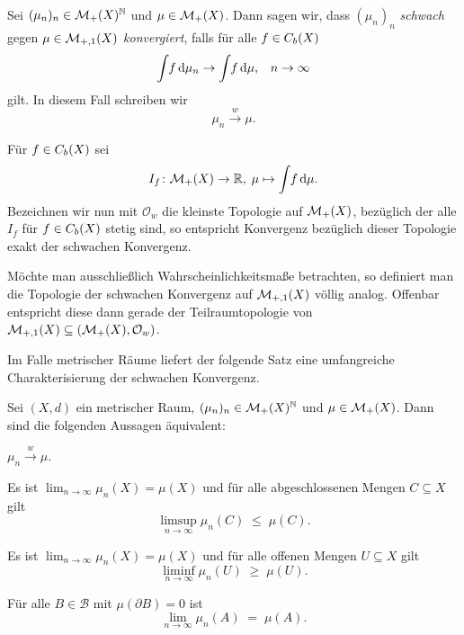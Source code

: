 \documentclass[../main/main.tex]{subfiles}
\begin{document}
	\begin{Definition}
		\label{def:weakconvergence}
		Sei $(\mu_n)_n \in \mathcal{M}_{+}(X)^{\mathbb{N}}$ und $\mu \in \mathcal{M}_{+}(X)$. 
		Dann sagen wir, dass $(\mu_n)_n$ 
		\emph{schwach} gegen $\mu \in \mathcal{M}_{+,1}(X)$ \emph{konvergiert}, 
		falls für alle $f \in C_b(X)$
		$$\int_{} \, f \, \mathrm{d}\mu_n \to \int_{} \, f \, \mathrm{d}\mu\text{,} 
		\quad n \to \infty $$
		gilt. In diesem Fall schreiben wir
		$$\mu_n \xrightarrow{w} \mu \text{.}$$
	\end{Definition}

	\begin{Definition}
		Für $f \in C_b(X)$ sei
		$$I_f \colon \mathcal{M}_{+}(X) \to \mathbb{R}, \; \mu \mapsto \int_{} \, f \, \mathrm{d}\mu  \text{.}$$
		Bezeichnen wir nun mit $\mathcal{O}_w$ die kleinste Topologie auf $\mathcal{M}_{+}(X)$, bezüglich der alle
		$I_f$ für $f \in C_b(X)$ stetig sind, so entspricht Konvergenz bezüglich dieser Topologie exakt
		der schwachen Konvergenz.
	\end{Definition}

	\begin{Bemerkung}
		Möchte man ausschließlich Wahrscheinlichkeitsmaße betrachten, so definiert man die Topologie der schwachen Konvergenz
		auf $\mathcal{M}_{+,1}(X)$ völlig analog. Offenbar entspricht diese dann gerade der Teilraumtopologie von $\mathcal{M}_{+,1}(X) \subseteq (\mathcal{M}_{+}(X), \mathcal{O}_w)$.
	\end{Bemerkung}
	
	Im Falle metrischer Räume liefert der folgende Satz eine umfangreiche Charakterisierung der schwachen Konvergenz.
	
	\begin{Satz}[Portmanteau]
		\label{thm:portmanteau}
		Sei $(X, d)$ ein metrischer Raum, $(\mu_n)_n \in \mathcal{M}_{+}(X)^{\mathbb{N}}$ 
		und $\mu \in \mathcal{M}_{+}(X)$. Dann sind die folgenden Aussagen äquivalent:
		\begin{equivalentthm}
			\item $\mu_n \xrightarrow{w} \mu$.
			\item Es ist 
			$\lim_{n \to \infty} \mu_n(X) = \mu(X)$
			und für alle abgeschlossenen Mengen $C \subseteq X$ gilt 
			$$\limsup_{n \to \infty} \mu_n(C) \; \leq \; \mu(C) \text{.}$$
			\item Es ist 
			$\lim_{n \to \infty} \mu_n(X) = \mu(X)$
			und für alle offenen Mengen $U \subseteq X$ gilt 
			$$\liminf_{n \to \infty} \mu_n(U) \; \geq \; \mu(U) \text{.}$$
			\item Für alle $B \in \mathcal{B}$ mit $\mu(\partial B) = 0$ 
			ist $$\lim_{n \to \infty} \mu_n(A) \; = \; \mu(A) \text{.}$$
		\end{equivalentthm}
	\end{Satz}
	
\end{document}
